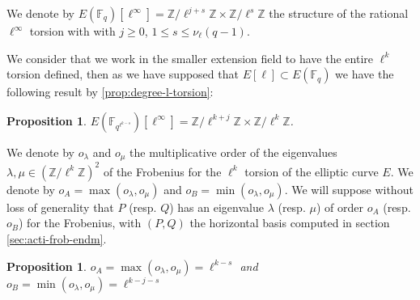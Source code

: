 \documentclass{lms}
\newtheorem{prop}[thm]{Proposition}
\begin{document}
\begin{defi}
We denote by $E(\mathbb{F}_q)[\ell^{\infty}]=\mathbb{Z}/\ell^{j+s}
\mathbb{Z} \times \mathbb{Z}/\ell^{s} \mathbb{Z}$ the structure of the rational $\ell^{\infty}$ torsion with with $j \geqslant 0$, $1 \leqslant s \leqslant \nu_\ell(q-1)$. 
\end{defi}
We consider that we work in the smaller extension field to have the entire $\ell^k$ torsion defined, then as we have supposed that $E[\ell] \subset E(\mathbb{F}_q)$ we have the following result by \ref{prop:degree-l-torsion}:

\begin{prop}
 $E(\mathbb{F}_{q^{\ell^{k-s}}})[\ell^{\infty}]=\mathbb{Z}/\ell^{k+j}
\mathbb{Z} \times \mathbb{Z}/\ell^{k} \mathbb{Z}$. 
\end{prop}

\begin{defi}
We denote by $o_{\lambda}$ and $o_{\mu}$ the multiplicative order of the
eigenvalues $\lambda , \mu \in (\mathbb{Z}/\ell^k\mathbb{Z})^2$ of the Frobenius for the
$\ell^{k}$ torsion of the elliptic curve $E$.
\newline
We denote by $o_A=\max(o_{\lambda},o_{\mu})$ and $o_B=\min(o_{\lambda},o_{\mu})$.
We will suppose without loss of generality that $P$ (resp. $Q$) has an eigenvalue $\lambda$ (resp. $\mu$) of order $o_A$ (resp. $o_B$) for the Frobenius, with $(P,Q)$ the horizontal basis computed in section \ref{sec:acti-frob-endm}.
\end{defi}

\begin{prop}
$o_A=\max(o_{\lambda},o_{\mu}) = \ell^{k-s}$ and $o_B=\min(o_{\lambda},o_{\mu}) = \ell^{k-j-s}$
\end{prop}
\end{document}
